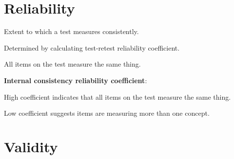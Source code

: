 \section{Reliability}

\begin{coloredlist}
    \item Extent to which a test measures consistently.
    \begin{coloredlist}
        \item Determined by calculating test-retest reliability coefficient.
    \end{coloredlist}
    \item {}
    \begin{coloredlist}
        \item All items on the test measure the same thing.
        \item \textbf{Internal consistency reliability coefficient}:
        \begin{coloredlist}
            \item High coefficient indicates that all items on the test measure the same thing.
            \item Low coefficient suggests items are measuring more than one concept.
        \end{coloredlist}
    \end{coloredlist}
\end{coloredlist}

\section{Validity}

